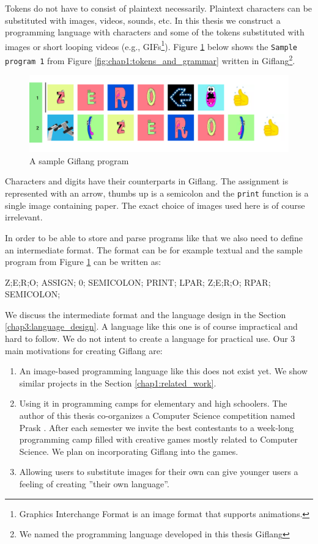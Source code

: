 Tokens do not have to consist of plaintext necessarily. Plaintext characters can be substituted with
images, videos, sounds, etc. In this thesis we construct a programming language with characters and some
of the tokens substituted with images or short looping videos (e.g., GIFs\footnote{Graphics Interchange Format is an image format that supports animations.}).
Figure \ref{fig:chap1:giflang_code} below shows the \texttt{Sample program 1} from Figure \ref{fig:chap1:tokens_and_grammar} written in
Giflang\footnote{We named the programming language developed in this thesis Giflang}.
\begin{figure}[!hbt]
	\includegraphics[width=\textwidth]{../img/giflang_code}
	\caption{A sample Giflang program}
	\label{fig:chap1:giflang_code}
\end{figure}

Characters and digits have their counterparts in Giflang. The assignment is represented with an arrow,
thumbs up is a semicolon and the \texttt{print} function is a single image containing paper. The exact choice of images used here is of course
irrelevant.

In order to be able to store and parse programs like that we also need to define an intermediate
format. The format can be for example textual and the sample program from Figure \ref{fig:chap1:giflang_code} can be written as:
\begin{code}
Z;E;R;O; ASSIGN; 0; SEMICOLON;
PRINT; LPAR; Z;E;R;O; RPAR; SEMICOLON;
\end{code}

We discuss the intermediate format and the language design in the Section \ref{chap3:language_design}. A language like this one is of
course impractical and hard to follow. We do not intent to create a language for practical use. Our $3$ main motivations for
creating Giflang are:
\begin{enumerate}
\item An image-based programming language like this does not exist yet. We show similar projects in the Section \ref{chap1:related_work}. 
\item Using it in programming camps for elementary and high schoolers. The author of this thesis co-organizes a Computer Science competition
named Prask \cite{Prask}. After each semester we invite the best contestants to a week-long programming camp
filled with creative games mostly related to Computer Science. We plan on incorporating Giflang into the games.
\item Allowing users to substitute images for their own can give younger users a feeling of creating ''their own language''.
\end{enumerate}

